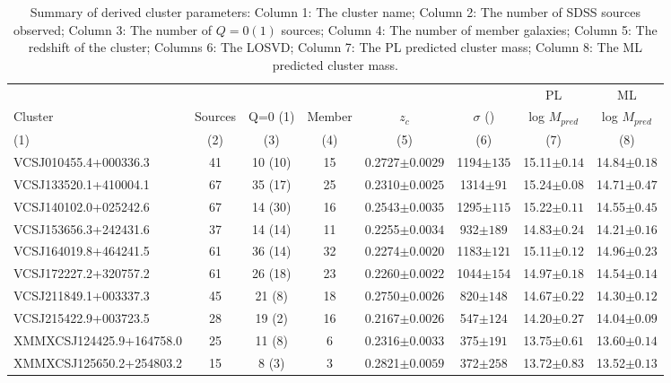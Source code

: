 \begin{landscape}
	\begin{table}
	\caption[Summary of derived cluster parameters.]{Summary of derived cluster parameters: Column 1: The cluster name; Column 2: The number of SDSS sources observed; Column 3: The number of $Q=0(1)$ sources; Column 4: The number of member galaxies; Column 5: The redshift of the cluster; Columns 6: The LOSVD; Column 7: The PL predicted cluster mass; Column 8: The ML predicted cluster mass.} 
	\begin{tabular}{lccccccc} 
		\hline 
		&&&&&& PL & ML \\
		Cluster & Sources & Q=0 (1) & Member & $z_{c}$ & $\sigma$ (\kms) & log $M_{pred}$ & log $M_{pred}$ \\
		(1) & (2) & (3) & (4) & (5) & (6) & (7) & (8) \\
		\hline \hline 
		VCSJ010455.4+000336.3 & 41 & 10 (10) & 15 & 0.2727$\pm{0.0029}$ & 1194$\pm{135}$ & 15.11$\pm{0.14}$ & 14.84$\pm{0.18}$ \\
		VCSJ133520.1+410004.1 & 67 & 35 (17) & 25 & 0.2310$\pm{0.0025}$ & 1314$\pm{91}$ & 15.24$\pm{0.08}$ & 14.71$\pm{0.47}$ \\
		VCSJ140102.0+025242.6 & 67 & 14 (30) & 16 & 0.2543$\pm{0.0035}$ & 1295$\pm{115}$ & 15.22$\pm{0.11}$ & 14.55$\pm{0.45}$ \\
		VCSJ153656.3+242431.6 & 37 & 14 (14) & 11 & 0.2255$\pm{0.0034}$ & 932$\pm{189}$ & 14.83$\pm{0.24}$ & 14.21$\pm{0.16}$ \\
		VCSJ164019.8+464241.5 & 61 & 36 (14) & 32 & 0.2274$\pm{0.0020}$ & 1183$\pm{121}$ & 15.11$\pm{0.12}$ & 14.96$\pm{0.23}$ \\
		VCSJ172227.2+320757.2 & 61 & 26 (18) & 23 & 0.2260$\pm{0.0022}$ & 1044$\pm{154}$ & 14.97$\pm{0.18}$ & 14.54$\pm{0.14}$ \\
		VCSJ211849.1+003337.3 & 45 & 21 (8) & 18 & 0.2750$\pm{0.0026}$ & 820$\pm{148}$ & 14.67$\pm{0.22}$ & 14.30$\pm{0.12}$ \\
		VCSJ215422.9+003723.5 & 28 & 19 (2) & 16 & 0.2167$\pm{0.0026}$ & 547$\pm{124}$ & 14.20$\pm{0.27}$ & 14.04$\pm{0.09}$ \\
		XMMXCSJ124425.9+164758.0 & 25 & 11 (8) & 6 & 0.2316$\pm{0.0033}$ & 375$\pm{191}$ & 13.75$\pm{0.61}$ & 13.60$\pm{0.14}$ \\
		XMMXCSJ125650.2+254803.2 & 15 & 8 (3) & 3 & 0.2821$\pm{0.0059}$ & 372$\pm{258}$ & 13.72$\pm{0.83}$ & 13.52$\pm{0.13}$ \\
		\hline 
		\end{tabular}
		\label{2tbl: derived parameters} 
	\end{table}
\end{landscape}

